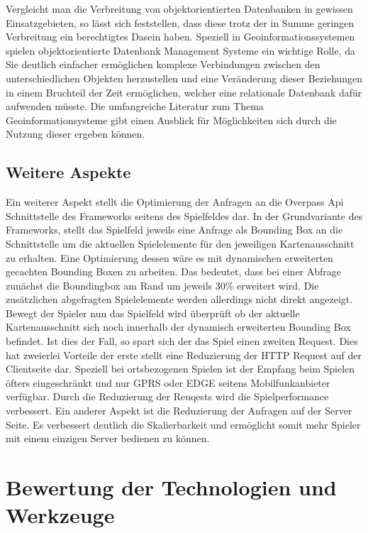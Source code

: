 Vergleicht man die Verbreitung von objektorientierten Datenbanken in gewissen Einsatzgebieten, so lässt sich feststellen, dass diese trotz der in Summe geringen Verbreitung ein berechtigtes Dasein haben. Speziell in Geoinformationssystemen spielen objektorientierte Datenbank Management Systeme ein wichtige Rolle,\cite{Brinkhoff.2005} da Sie deutlich einfacher ermöglichen komplexe Verbindungen zwischen den unterschiedlichen Objekten herzustellen und eine Veränderung dieser Beziehungen in einem Bruchteil der Zeit ermöglichen, welcher eine relationale Datenbank dafür aufwenden müsste. Die umfangreiche Literatur zum Thema Geoinformationsysteme gibt einen Ausblick für Möglichkeiten sich durch die Nutzung dieser ergeben können.

\subsection*{Weitere Aspekte}

Ein weiterer Aspekt stellt die Optimierung der Anfragen an die Overpass Api Schnittstelle des Frameworks seitens des Spielfeldes dar. In der Grundvariante des Frameworks, stellt das Spielfeld jeweils eine Anfrage als Bounding Box an die Schnittstelle um die aktuellen Spielelemente für den jeweiligen Kartenausschnitt zu erhalten. Eine Optimierung dessen wäre es mit dynamischen erweiterten gecachten Bounding Boxen zu arbeiten. Das bedeutet, dass bei einer Abfrage zunächst die Boundingbox am Rand um jeweils 30\% erweitert wird. Die zusätzlichen abgefragten Spielelemente werden allerdings nicht direkt angezeigt. Bewegt der Spieler nun das Spielfeld wird überprüft ob der aktuelle Kartenausschnitt sich noch innerhalb der dynamisch erweiterten Bounding Box befindet. Ist dies der Fall, so spart sich der das Spiel einen zweiten Request. Dies hat zweierlei Vorteile der erste stellt eine Reduzierung der HTTP Request auf der Clientseite dar. Speziell bei ortsbezogenen Spielen ist der Empfang beim Spielen öfters eingeschränkt und nur GPRS oder EDGE seitens Mobilfunkanbieter verfügbar. Durch die Reduzierung der Reuqests wird die Spielperformance verbessert. Ein anderer Aspekt ist die Reduzierung der Anfragen auf der Server Seite. Es verbessert deutlich die Skalierbarkeit und ermöglicht somit mehr Spieler mit einem einzigen Server bedienen zu können.


\section{Bewertung der Technologien und Werkzeuge}

